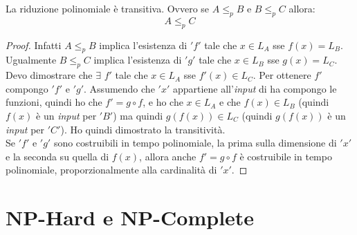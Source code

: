 						\begin{definizione}
							La riduzione polinomiale è transitiva. Ovvero se $A\leq_p B$ e $B\leq_p C$
							allora:
							\[A\leq_p C\]
							\begin{proof}
								Infatti $A\leq_p B$ implica l'esistenza di $ 'f' $ tale che $x\in L_A$ sse
								$f(x)=L_B$. Ugualmente $B\leq_p C$ implica l'esistenza di $ 'g' $ tale che $x\in
								L_B$ sse $g(x)=L_C$.\\
								Devo dimostrare che $\exists\,\,f'$ tale che $x\in L_A$ sse $f'(x)\in
								L_C$. Per ottenere $f'$ compongo $ 'f' $ e $ 'g' $. Assumendo che $ 'x' $ appartiene
								all'\textit{input} di ha compongo le funzioni, quindi ho che $f'=g\circ f$,
								e ho che $x\in L_A$ e che $f(x)\in L_B$ (quindi $f(x)$ è un \textit{input} per $ 'B' $) ma
								quindi $g(f(x))\in L_C$ (quindi $g(f(x))$ è un \textit{input} per $ 'C' $). Ho quindi
								dimostrato la transitività.\\
								Se $ 'f' $ e $ 'g' $ sono costruibili in tempo polinomiale, la prima sulla dimensione
								di $ 'x' $ e la seconda su quella di $f(x)$, allora anche $f'=g\circ f$
								è costruibile in tempo polinomiale, proporzionalmente alla cardinalità di $ 'x' $.
							\end{proof}
							
						\end{definizione}
						\section{NP-Hard e NP-Complete}
